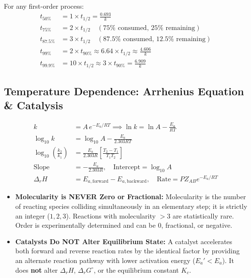 \documentclass[10pt,twoside,openright]{book}
\begin{document}
\begin{usecasebox}
For any first-order process:
\begin{align*}
  t_{50\%} &= 1 \times t_{1/2} = \frac{0.693}{k} \\
  t_{75\%} &= 2 \times t_{1/2} \quad (75\% \text{ consumed, } 25\% \text{ remaining}) \\
  t_{87.5\%} &= 3 \times t_{1/2} \quad (87.5\% \text{ consumed, } 12.5\% \text{ remaining}) \\
  t_{99\%} &= 2 \times t_{90\%} \approx 6.64 \times t_{1/2} \approx \frac{4.606}{k} \\
  t_{99.9\%} &= 10 \times t_{1/2} \approx 3 \times t_{90\%} = \frac{6.909}{k}
\end{align*}
\end{usecasebox}

\subsection{Temperature Dependence: Arrhenius Equation \& Catalysis}

\begin{formulabox}
\begin{align}
  k &= A\,e^{-E_a / R T} \implies \ln k = \ln A - \frac{E_a}{R T} \\
  \log_{10} k &= \log_{10} A - \frac{E_a}{2.303 R T} \\
  \log_{10}\left(\frac{k_2}{k_1}\right) &= \frac{E_a}{2.303 R}\left[\frac{T_2 - T_1}{T_1 T_2}\right] \\
  \text{Slope} &= -\frac{E_a}{2.303 R}, \quad \text{Intercept} = \log_{10} A \\
  \Delta_r H &= E_{a,\text{forward}} - E_{a,\text{backward}}, \quad \text{Rate} = P Z_{AB} e^{-E_a / RT}
\end{align}
\end{formulabox}

\begin{trapbox}
\begin{itemize}
  \item \textbf{Molecularity is NEVER Zero or Fractional:} Molecularity is the number of reacting species colliding simultaneously in an elementary step; it is strictly an integer ($1, 2, 3$). Reactions with molecularity $>3$ are statistically rare. Order is experimentally determined and can be $0$, fractional, or negative.
  \item \textbf{Catalysts Do NOT Alter Equilibrium State:} A catalyst accelerates both forward and reverse reaction rates by the identical factor by providing an alternate reaction pathway with lower activation energy ($E_a' < E_a$). It does \textbf{not} alter $\Delta_r H$, $\Delta_r G^\circ$, or the equilibrium constant $K_c$.
\end{itemize}
\end{trapbox}
\end{document}
